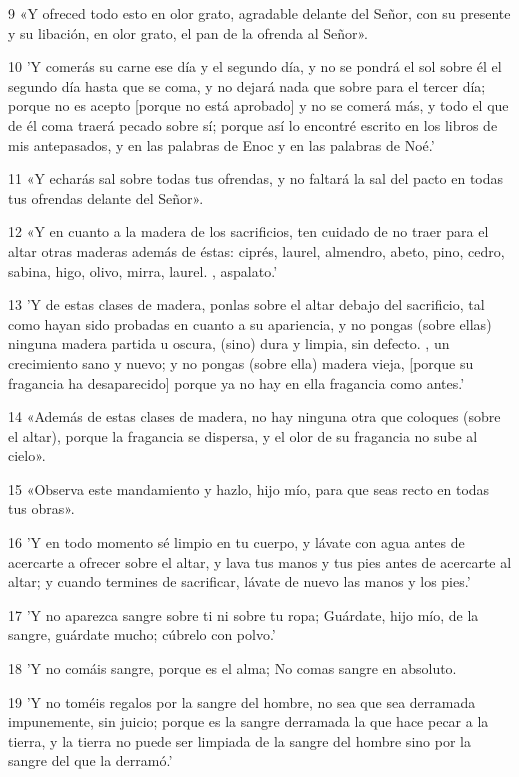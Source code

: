 \par 9 «Y ofreced todo esto en olor grato, agradable delante del Señor, con su presente y su libación, en olor grato, el pan de la ofrenda al Señor».
\par 10 'Y comerás su carne ese día y el segundo día, y no se pondrá el sol sobre él el segundo día hasta que se coma, y ​​no dejará nada que sobre para el tercer día; porque no es acepto [porque no está aprobado] y no se comerá más, y todo el que de él coma traerá pecado sobre sí; porque así lo encontré escrito en los libros de mis antepasados, y en las palabras de Enoc y en las palabras de Noé.'
\par 11 «Y echarás sal sobre todas tus ofrendas, y no faltará la sal del pacto en todas tus ofrendas delante del Señor».
\par 12 «Y en cuanto a la madera de los sacrificios, ten cuidado de no traer para el altar otras maderas además de éstas: ciprés, laurel, almendro, abeto, pino, cedro, sabina, higo, olivo, mirra, laurel. , aspalato.'
\par 13 'Y de estas clases de madera, ponlas sobre el altar debajo del sacrificio, tal como hayan sido probadas en cuanto a su apariencia, y no pongas (sobre ellas) ninguna madera partida u oscura, (sino) dura y limpia, sin defecto. , un crecimiento sano y nuevo; y no pongas (sobre ella) madera vieja, [porque su fragancia ha desaparecido] porque ya no hay en ella fragancia como antes.'
\par 14 «Además de estas clases de madera, no hay ninguna otra que coloques (sobre el altar), porque la fragancia se dispersa, y el olor de su fragancia no sube al cielo».
\par 15 «Observa este mandamiento y hazlo, hijo mío, para que seas recto en todas tus obras».
\par 16 'Y en todo momento sé limpio en tu cuerpo, y lávate con agua antes de acercarte a ofrecer sobre el altar, y lava tus manos y tus pies antes de acercarte al altar; y cuando termines de sacrificar, lávate de nuevo las manos y los pies.'
\par 17 'Y no aparezca sangre sobre ti ni sobre tu ropa; Guárdate, hijo mío, de la sangre, guárdate mucho; cúbrelo con polvo.'
\par 18 'Y no comáis sangre, porque es el alma; No comas sangre en absoluto.
\par 19 'Y no toméis regalos por la sangre del hombre, no sea que sea derramada impunemente, sin juicio; porque es la sangre derramada la que hace pecar a la tierra, y la tierra no puede ser limpiada de la sangre del hombre sino por la sangre del que la derramó.'
